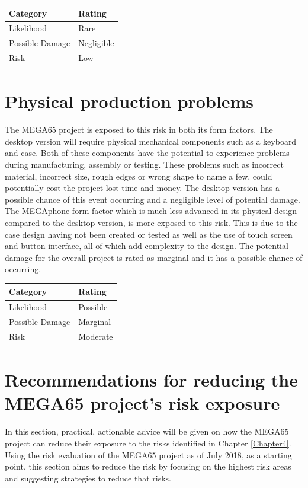 \begin{tabular}{l|l} %
    	\textbf{Category} 	&	\textbf{Rating} \\
      \hline
     Likelihood			&	Rare \\
     Possible Damage 	& 	Negligible \\
     Risk 				&	Low		\\	
    \end{tabular}


\section{Physical production problems}
The MEGA65 project is exposed to this risk in both its form factors. The desktop version will require physical mechanical components such as a keyboard and case. Both of these components have the potential to experience problems during manufacturing, assembly or testing. These problems such as incorrect material, incorrect size, rough edges or wrong shape to name a few, could potentially cost the project lost time and money. The desktop version has a possible chance of this event occurring and a negligible level of potential damage. The MEGAphone form factor which is much less advanced in its physical design compared to the desktop version, is more exposed to this risk. This is due to the case design having not been created or tested as well as the use of touch screen and button interface, all of which add complexity to the design. The potential damage for the overall project is rated as marginal and it has a possible chance of occurring. \\ 

\begin{tabular}{l|l} %
    	\textbf{Category} 	&	\textbf{Rating} \\
      \hline
     Likelihood			&	Possible \\
     Possible Damage 	& 	Marginal \\
     Risk 				&	Moderate \\	
    \end{tabular}


\section{Recommendations for reducing the MEGA65 project's risk exposure}
In this section, practical, actionable advice will be given on how the MEGA65 project can reduce their exposure to the risks identified in Chapter \ref{Chapter4}. Using the risk evaluation of the MEGA65 project as of July 2018, as a starting point, this section aims to reduce the risk by focusing on the highest risk areas and suggesting strategies to reduce that risks.


